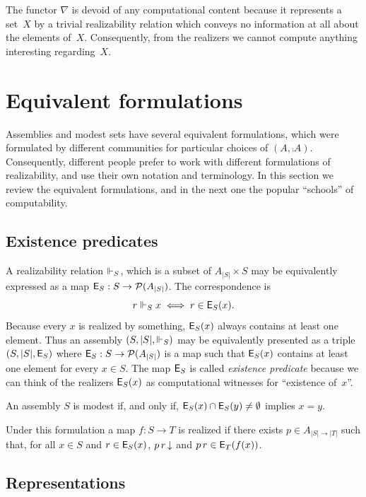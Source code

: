The functor $\nabla$ is devoid of any computational content because it
represents a set~$X$ by a trivial realizability relation which conveys
no information at all about the elements of~$X$. Consequently, from
the realizers we cannot compute anything interesting regarding~$X$.


\section{Equivalent formulations}
\label{sec:equivalent-formulations}

Assemblies and modest sets have several equivalent formulations, which
were formulated by different communities for particular choices of
$(A, \comp{A})$. Consequently, different people prefer to work with
different formulations of realizability, and use their own notation
and terminology. In this section we review the equivalent
formulations, and in the next one the popular ``schools'' of
computability.

\subsection{Existence predicates}
\label{sec:existence-predicates}

A realizability relation $\Vdash_S$, which is a subset of $A_{|S|} \times
S$ may be equivalently expressed as a map $\mathsf{E}_S : S \to
\mathcal{P}(A_{|S|})$. The correspondence is
%
\begin{equation*}
  r \Vdash_S x \iff r \in \mathsf{E}_S(x).
\end{equation*}
%
Because every $x$ is realized by something, $\mathsf{E}_S(x)$ always contains
at least one element. Thus an assembly $(S, |S|, {\Vdash_S})$ may be
equivalently presented as a triple $(S, |S|, \mathsf{E}_S)$ where $\mathsf{E}_S : S
\to \mathcal{P}(A_{|S|})$ is a map such that $\mathsf{E}_S(x)$ contains at least one
element for every $x \in S$. The map $\mathsf{E}_S$ is called \emph{existence
predicate} because we can think of the realizers $\mathsf{E}_S(x)$ as
computational witnesses for ``existence of~$x$''.

An assembly $S$ is modest if, and only if, $\mathsf{E}_S(x) \cap \mathsf{E}_S(y)
\neq \emptyset$ implies $x = y$.

Under this formulation a map $f : S \to T$ is realized if there exists
$p \in A_{|S| \to |T|}$ such that, for all $x \in S$ and $r \in
\mathsf{E}_S(x)$, $p\,r\,{\downarrow}$ and $p\,r \in \mathsf{E}_T(f(x))$.

\subsection{Representations}
\label{sec:representations}


